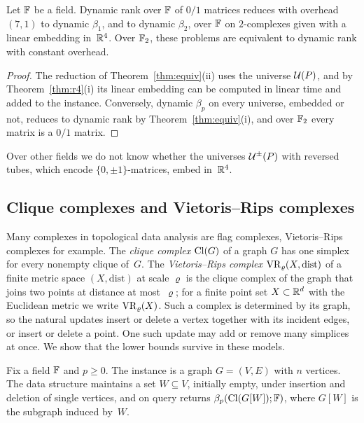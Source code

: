 \begin{corollary}\label{cor:r4-equiv}
Let $\mathbb{F}$ be a field.
Dynamic rank over $\mathbb{F}$ of $0/1$ matrices reduces with overhead $(7,1)$ to dynamic $\beta_1$, and to dynamic $\beta_2$, over $\mathbb{F}$ on $2$-complexes given with a linear embedding in~$\mathbb{R}^4$.
Over $\mathbb{F}_2$, these problems are equivalent to dynamic rank with constant overhead.
\end{corollary}

\begin{proof}
The reduction of Theorem~\ref{thm:equiv}(ii) uses the universe $\mathcal{U}(P)$, and by Theorem~\ref{thm:r4}(i) its linear embedding can be computed in linear time and added to the instance.
Conversely, dynamic $\beta_p$ on every universe, embedded or not, reduces to dynamic rank by Theorem~\ref{thm:equiv}(i), and over $\mathbb{F}_2$ every matrix is a $0/1$ matrix.
\end{proof}
Over other fields we do not know whether the universes $\mathcal{U}^{\pm}(P)$ with reversed tubes, which encode $\{0,\pm1\}$-matrices, embed in~$\mathbb{R}^4$.


\subsection{Clique complexes and Vietoris--Rips complexes}\label{sec:flag}

Many complexes in topological data analysis are flag complexes, Vietoris--Rips complexes for example.
The \emph{clique complex} $\mathrm{Cl}(G)$ of a graph $G$ has one simplex for every nonempty clique of~$G$.
The \emph{Vietoris--Rips complex} $\mathrm{VR}_\varrho(X,\mathrm{dist})$ of a finite metric space $(X,\mathrm{dist})$ at scale $\varrho$ is the clique complex of the graph that joins two points at distance at most~$\varrho$; for a finite point set $X\subset\mathbb{R}^d$ with the Euclidean metric we write $\mathrm{VR}_\varrho(X)$.
Such a complex is determined by its graph, so the natural updates insert or delete a vertex together with its incident edges, or insert or delete a point.
One such update may add or remove many simplices at once.
We show that the lower bounds survive in these models.

\begin{problem}\label{prob:clique}
Fix a field $\mathbb{F}$ and $p\ge0$.
The instance is a graph $G=(V,E)$ with $n$ vertices.
The data structure maintains a set $W\subseteq V$, initially empty, under insertion and deletion of single vertices, and on query returns $\beta_p(\mathrm{Cl}(G[W]);\mathbb{F})$, where $G[W]$ is the subgraph induced by~$W$.
\end{problem}

